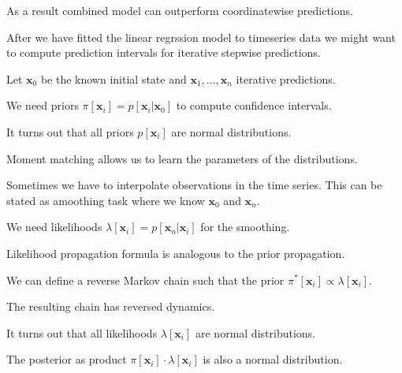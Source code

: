 \documentclass[landscape,footrule]{foils}
\renewcommand{\vec}[1]{\boldsymbol{#1}}
\begin{document}

As a result combined model can outperform coordinatewise predictions. \vspace*{-2ex}



After we have fitted the linear regrssion model to timeseries data we might want to compute prediction intervals for iterative stepwise predictions.

\begin{triangles}
\item Let $\vec{x}_0$ be the known initial state and $\vec{x}_1, \ldots, \vec{x}_n$ iterative predictions.
\item We need priors $\pi[\vec{x}_i]=p[\vec{x}_i|\vec{x}_0]$ to compute confidence intervals.
\item It turns out that all priors $p[\vec{x}_i]$ are normal distributions.
\item Moment matching allows us to learn the parameters of the distributions.
\end{triangles}




Sometimes we have to interpolate observations in the time series. This can be stated as amoothing task where we know $\vec{x}_0$ and $\vec{x}_n$.

\begin{triangles}
\item We need likelihoods $\lambda[\vec{x}_i]=p[\vec{x}_n|\vec{x}_i]$ for the smoothing.
\item Likelihood propagation formula is analogous to the prior propagation.
\item We can define a reverse Markov chain such that the prior $\pi^*[\vec{x}_i]\propto \lambda[\vec{x}_i]$. 
\item The resulting chain has reversed dynamics. 
\item It turns out that all likelihoods $\lambda[\vec{x}_i]$ are normal distributions.
\item The posterior as product $\pi[\vec{x}_i]\cdot \lambda[\vec{x}_i]$ is also a normal distribution.
\end{triangles}


\end{document}
